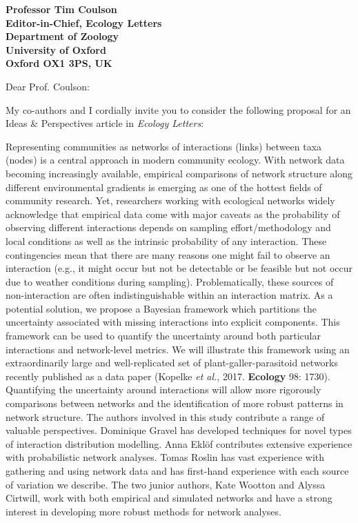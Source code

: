 \documentclass[12pt]{letter}
\newcommand{\myjournal}{\emph{Ecology Letters}}
\begin{document}
\begin{letter}{\bf Professor Tim Coulson\\
               Editor-in-Chief, Ecology Letters\\
               Department of Zoology\\
               University of Oxford\\
               Oxford OX1 3PS, UK
                               }


\opening{Dear Prof. Coulson:}

    My co-authors and I cordially invite you to consider the 
    following proposal for an Ideas \& Perspectives article in 
    \myjournal:

    Representing communities as networks of interactions (links) between taxa (nodes) is a central approach in modern community ecology. With network data becoming increasingly available, empirical comparisons of network structure along different environmental gradients is emerging as one of the hottest fields of community research. Yet, researchers working with ecological networks widely acknowledge that empirical data come with major caveats as the probability of observing different interactions depends on sampling effort/methodology and local conditions as well as the intrinsic probability of any interaction. These contingencies mean that there are many reasons one might fail to observe an interaction (e.g., it might occur but not be detectable or be feasible but not occur due to weather conditions during sampling). Problematically, these sources of non-interaction are often indistinguishable within an interaction matrix. As a potential solution, we propose a Bayesian framework which partitions the uncertainty associated with missing interactions into explicit components. This framework can be used to quantify the uncertainty around both particular interactions and network-level metrics. We will illustrate this framework using an extraordinarily large and well-replicated set of plant-galler-parasitoid networks recently published as a data paper (Kopelke \emph{et al.}, 2017. \textbf{Ecology} 98: 1730). Quantifying the uncertainty around interactions will allow more rigorously comparisons between networks and the identification of more robust patterns in network structure. The authors involved in this study contribute a range of valuable perspectives. Dominique Gravel has developed techniques for novel types of interaction distribution modelling. Anna Eklöf contributes extensive experience with probabilistic network analyses. Tomas Roslin has vast experience with gathering and using network data and has first-hand experience with each source of variation we describe. The two junior authors, Kate Wootton and Alyssa Cirtwill, work with both empirical and simulated networks and have a strong interest in developing more robust methods for network analyses.


\end{letter}
\end{document}
